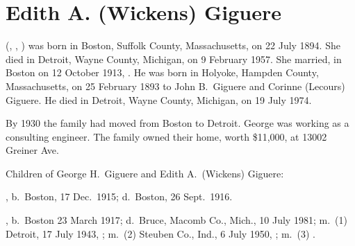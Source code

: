 \section{Edith A. (Wickens) Giguere}

 (, , ) was born in Boston, Suffolk County, Massachusetts, on 22 July 1894.\cite{Edith4WickensBirth} She died in Detroit, Wayne County, Michigan, on 9 February 1957.\cite{Edith4WickensDeath} She married, in Boston on 12 October 1913, .\cite{Edith4WickensMarriage} He was born in Holyoke, Hampden County, Massachusetts, on 25 February 1893 to John B.\ Giguere and Corinne (Lecours) Giguere.\cite{GeorgeGiguereBirth} He died in Detroit, Wayne County, Michigan, on 19 July 1974.\cite{GeorgeGiguereDeath}

By 1930 the family had moved from Boston to Detroit. George was working as a consulting engineer. The family owned their home, worth \$11,000, at 13002 Greiner Ave.\cite{Census1930GeorgeGiguere}

\begin{KidsIntro}
	Children of George H.\ Giguere and Edith A.\ (Wickens) Giguere:
\end{KidsIntro}

\begin{Kids}
	, b.\ Boston, 17 Dec.\ 1915;\cite{Robert5GiguereDeath} d.\ Boston, 26 Sept.\ 1916.\cite{Robert5GiguereDeath}
	
	, b.\ Boston 23 March 1917;\cite{JohnMeyersMarriage,Dorris5GiguereSSDeath} d.\ Bruce, Macomb Co., Mich., 10 July 1981;\cite{Dorris5GiguereMichiganDeath} m.\ (1) Detroit, 17 July 1943, ;\cite{RobertMayMarriage} m.\ (2) Steuben Co., Ind., 6 July 1950, ;\cite{JohnMeyersMarriage} m.\ (3) .\cite{Dorris5GiguereObit}
\end{Kids}